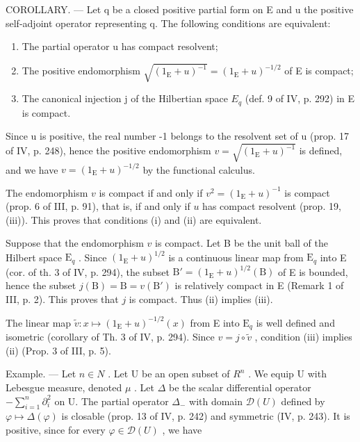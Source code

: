 COROLLARY. --- Let q be a closed positive partial form on E and u the positive self-adjoint operator representing q. The following conditions are equivalent:

\begin{enumerate}
\def\labelenumi{(\roman{enumi})}
\item
  The partial operator u has compact resolvent;
\item
  The positive endomorphism \(\sqrt{(1_{\mathrm{E}} + u)^{-1}} = (1_{\mathrm{E}} + u)^{-1 / 2}\) of E is compact;
\item
  The canonical injection j of the Hilbertian space \(E_{q}\) (def. 9 of IV, p. 292) in E is compact.
\end{enumerate}

Since u is positive, the real number -1 belongs to the resolvent set of u (prop. 17 of IV, p. 248), hence the positive endomorphism \(v = \sqrt{(1_{\mathrm{E}} + u)^{-1}}\) is defined, and we have \(v = (1_{\mathrm{E}} + u)^{-1/2}\) by the functional calculus.

The endomorphism \(v\) is compact if and only if \(v^2 = (1_{\mathrm{E}} + u)^{-1}\) is compact (prop. 6 of III, p. 91), that is, if and only if \(u\) has compact resolvent (prop. 19, (iii)). This proves that conditions (i) and (ii) are equivalent.

Suppose that the endomorphism \(v\) is compact. Let B be the unit ball of the Hilbert space \(\mathrm{E}_q\) . Since \((1_{\mathrm{E}} + u)^{1/2}\) is a continuous linear map from \(\mathrm{E}_q\) into E (cor. of th. 3 of IV, p. 294), the subset \(\mathrm{B}' = (1_{\mathrm{E}} + u)^{1/2}(\mathrm{B})\) of E is bounded, hence the subset \(j(\mathrm{B}) = \mathrm{B} = v(\mathrm{B}')\) is relatively compact in E (Remark 1 of III, p. 2). This proves that \(j\) is compact. Thus (ii) implies (iii).

The linear map \(\widetilde{v}\colon x\mapsto(1_{\mathrm{E}}+u)^{-1/2}(x)\) from E into \(\mathrm{E}_{q}\) is well defined and isometric (corollary of Th. 3 of IV, p. 294). Since \(v=j\circ\widetilde{v}\) , condition (iii) implies (ii) (Prop. 3 of III, p. 5).

Example. --- Let \(n \in N\) . Let U be an open subset of \(R^{n}\) . We equip U with Lebesgue measure, denoted \(\mu\) . Let \(\Delta\) be the scalar differential operator \(-\sum_{i=1}^{n}\partial_{i}^{2}\) on U. The partial operator \(\Delta_{-}\) with domain \(\mathcal{D}(U)\) defined by \(\varphi \mapsto \Delta(\varphi)\) is closable (prop. 13 of IV, p. 242) and symmetric (IV, p. 243). It is positive, since for every \(\varphi \in \mathcal{D}(U)\) , we have

